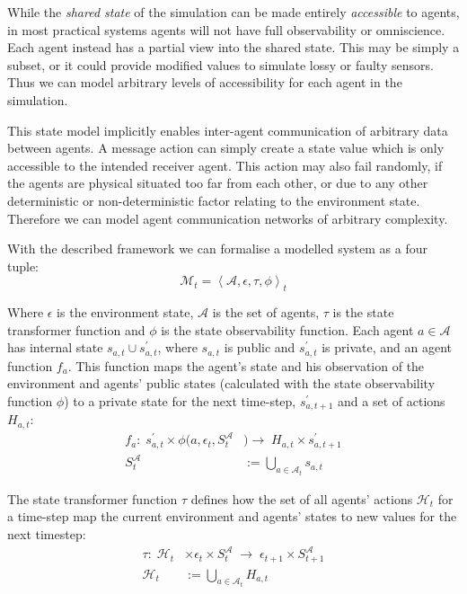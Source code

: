 While the \emph{shared state} of the simulation can be made entirely
\emph{accessible} to agents, in most practical systems agents will not have
full observability or omniscience. Each agent instead has a partial view into
the shared state. This may be simply a subset, or it could provide modified
values to simulate lossy or faulty sensors. Thus we can model arbitrary levels
of accessibility for each agent in the simulation.

This state model implicitly enables inter-agent communication of arbitrary
data between agents. A message action can simply create a state value which is
only accessible to the intended receiver agent. This action may also fail
randomly, if the agents are physical situated too far from each other, or due
to any other deterministic or non-deterministic factor relating to the environment
state. Therefore we can model agent communication networks of arbitrary
complexity.


With the described framework we can formalise a modelled system as a four tuple:
\begin{equation*}
\mathcal{M}_{t}=\left\langle \mathcal{A},\epsilon,\tau,\phi \right\rangle _{t}
\end{equation*}

Where $\epsilon$ is the environment state, $\mathcal{A}$ is the set of agents, $\tau$ is the state transformer function and $\phi$ is the state observability function. Each
agent $a\in\mathcal{A}$ has internal state $s_{a,t}\cup s_{a,t}^{\prime}$,
where $s_{a,t}$ is public and $s_{a,t}^{\prime}$ is private, and
an agent function $f_{a}$. This function maps the agent's state and his observation of the environment and agents' public states (calculated with the state observability function $\phi$) to a private
state for the next time-step, $s_{a,t+1}^{\prime}$ and a set of actions
$H{}_{a,t}$:
\begin{align*}
f_{a}:\; s_{a,t}^{\prime} \times \phi(a, \epsilon_{t}, S_{t}^{\mathcal{A}}&) \rightarrow\; H_{a,t}\times s_{a,t+1}^{\prime}\\
S_{t}^{\mathcal{A}}&:=\bigcup_{a\in\mathcal{A}_{t}}s_{a,t}
\end{align*}

The state transformer function $\tau$ defines how the set of all
agents' actions $\mathcal{H}_{t}$ for a time-step map the current
environment and agents' states to new values for the next timestep:
\begin{align*}
\tau:\;\mathcal{H}_{t}&\times\epsilon_{t}\times S_{t}^{\mathcal{A}}\;\rightarrow\;\epsilon_{t+1}\times S_{t+1}^{\mathcal{A}} \\
\mathcal{H}{}_{t}&:=\bigcup_{a\in\mathcal{A}_{t}}H_{a,t}
\end{align*}

